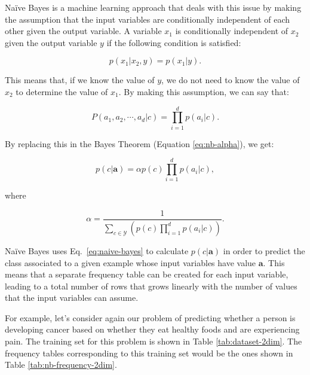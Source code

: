 Na\"{i}ve Bayes is a machine learning approach that deals with this issue by making the assumption that the input variables are conditionally independent of each other given the output variable. A variable $x_1$ is conditionally independent of $x_2$ given the output variable $y$ if the following condition is satisfied:

\[ p(x_1|x_2,y) = p(x_1|y) . \]

\noindent This means that, if we know the value of $y$, we do not need to know the value of $x_2$ to determine the value of $x_1$. By making this assumption, we can say that:

\[ P(a_1,a_2,\cdots,a_d|c) = \prod_{i=1}^d p(a_i|c). \]

\noindent By replacing this in the Bayes Theorem (Equation \ref{eq:nb-alpha}), we get:

\begin{equation}p(c|\mathbf{a}) = \alpha p(c) \prod_{i=1}^d p(a_i|c),\label{eq:naive-bayes}
\end{equation}

\noindent where 

\[\alpha = \frac{1}{\sum_{c \in \mathcal{Y}} \left( p(c) \prod_{i=1}^d p(a_i|c)\right)} .\]

Na\"{i}ve Bayes uses Eq.~\ref{eq:naive-bayes} to calculate $p(c|\mathbf{a})$ in order to predict the class associated to a given example whose input variables have value $\mathbf{a}$. This means that a separate frequency table can be created for each input variable, leading to a total number of rows that grows linearly with the number of values that the input variables can assume. 

For example, let's consider again our problem of predicting whether a person is developing cancer based on whether they eat healthy foods and are experiencing pain. The training set for this problem is shown in Table \ref{tab:dataset-2dim}. The frequency tables corresponding to this training set would be the ones shown in Table \ref{tab:nb-frequency-2dim}.

